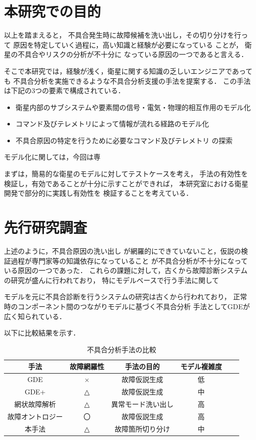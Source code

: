 \documentclass[11pt]{article}
\begin{document}
\section{本研究での目的}
以上を踏まえると，
不具合発生時に故障候補を洗い出し，その切り分けを行って
原因を特定していく過程に，高い知識と経験が必要になっている
ことが，
衛星の不具合やリスクの分析が不十分に
なっている原因の一つであると言える．

そこで本研究では，経験が浅く，衛星に関する知識の乏しいエンジニアであっても
不具合分析を実施できるような不具合分析支援の手法を提案する．
この手法は下記の3つの要素で構成されている．
\begin{itemize}
   \item 衛星内部のサブシステムや要素間の信号・電気・物理的相互作用のモデル化
   \item コマンド及びテレメトリによって情報が流れる経路のモデル化
   \item 不具合原因の特定を行うために必要なコマンド及びテレメトリ
   の探索 %
\end{itemize}
   
モデル化に関しては，今回は専

まずは，簡易的な衛星のモデルに対してテストケースを考え，
手法の有効性を検証し，有効であることが十分に示すことができれば，
本研究室における衛星開発で部分的に実践し有効性を
検証することを考えている．\\

\section{先行研究調査}
上述のように，不具合原因の洗い出し
が網羅的にできていないこと，仮説の検証過程が専門家等の知識依存になっていること
が不具合分析が不十分になっている原因の一つであった．%
これらの課題に対して，古くから故障診断システムの研究が盛んに行われており，
特にモデルベースで行う手法に関して

モデルを元に不具合診断を行うシステムの研究は古くから行われており，\cite{}
正常時のコンポーネント間のつながりモデルに基づく不具合分析
手法としてGDEが広く知られている．

以下に比較結果を示す．
\begin{table}[H]
   \centering
   \caption{不具合分析手法の比較}
      \begin{tabular}{cccccc} \hline%
         手法&故障網羅性&手法の目的&モデル複雑度%
         \\ \hline
         GDE&×&故障仮説生成&低\\
         GDE+\cite{Struss1989}&△&故障仮説生成&中\\
         網状故障解析\cite{Yamaguchi2014}&△&異常モード洗い出し&高\\
         故障オントロジー\cite{Kitamura1999}&〇&故障仮説生成&高\\
         本手法&△&故障箇所切り分け&中\\ \hline
      \end{tabular}
\end{table}
\end{document}
